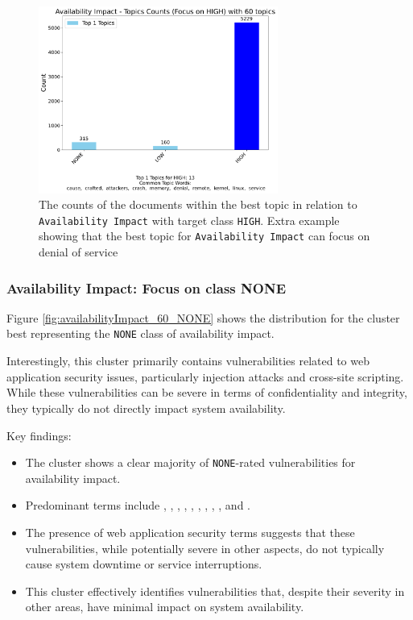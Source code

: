 \documentclass[12pt]{article}
\begin{document}
\begin{figure}[ht]
	\centering
	\includegraphics[width=0.7\textwidth]{figures/availabilityImpact/merged_top_k_topics_category_focus_counts_availabilityImpact_HIGH_k1_denial.pdf}
	\caption{The counts of the documents within the best topic in relation to \texttt{Availability
			Impact} with target class \texttt{HIGH}. Extra example showing that the best topic for \texttt{Availability
			Impact} can focus on denial of service}
	\label{fig:availabilityImpact_60_HIGH_denial}
\end{figure}

\subsubsection{Availability Impact: Focus on class NONE}

Figure \ref{fig:availabilityImpact_60_NONE} shows the distribution for the cluster best representing
the \texttt{NONE} class of availability impact.

Interestingly, this cluster primarily contains vulnerabilities related to web application security
issues, particularly injection attacks and cross-site scripting. While these vulnerabilities can be
severe in terms of confidentiality and integrity, they typically do not directly impact system
availability.

Key findings:

\begin{itemize}

	\item The cluster shows a clear majority of \texttt{NONE}-rated vulnerabilities for availability
	      impact.

	\item Predominant terms include , , , , , ,
	      , , , and .

	\item The presence of web application security terms suggests that these vulnerabilities, while
	      potentially severe in other aspects, do not typically cause system downtime or service
	      interruptions.

	\item This cluster effectively identifies vulnerabilities that, despite their severity in other
	      areas, have minimal impact on system availability.

\end{itemize}
\end{document}
